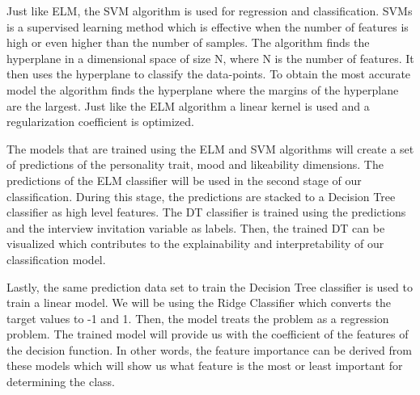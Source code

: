 Just like ELM, the SVM algorithm is used for regression and classification. SVMs is a supervised learning method which is effective when the number of features is high or even higher than the number of samples. The algorithm finds the hyperplane in a dimensional space of size N, where N is the number of features. It then uses the hyperplane to classify the data-points. To obtain the most accurate model the algorithm finds the hyperplane where the margins of the hyperplane are the largest. Just like the ELM algorithm a linear kernel is used and a regularization coefficient is optimized. 

The models that are trained using the ELM and SVM algorithms will create a set of predictions of the personality trait, mood and likeability dimensions. The predictions of the ELM classifier will be used in the second stage of our classification. During this stage, the predictions are stacked to a Decision Tree classifier as high level features. The DT classifier is trained using the predictions and the interview invitation variable as labels. Then, the trained DT can be visualized which contributes to the explainability and interpretability of our classification model.

Lastly, the same prediction data set to train the Decision Tree classifier is used to train a linear model. We will be using the Ridge Classifier which converts the target values to -1 and 1. Then, the model treats the problem as a regression problem. The trained model will provide us with the coefficient of the features of the decision function. In other words, the feature importance can be derived from these models which will show us what feature is the most or least important for determining the class.


